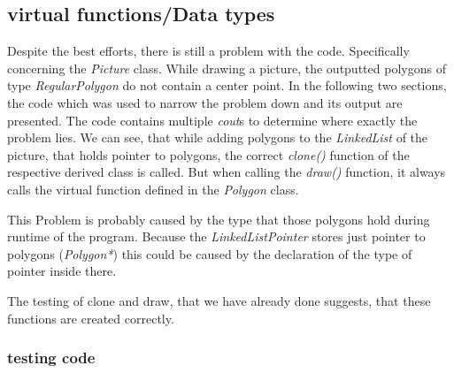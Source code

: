 \documentclass[11pt,titlepage]{article}
\begin{document}
		\subsection{virtual functions/Data types}
			Despite the best efforts, there is still a problem with the code. Specifically concerning the \emph{Picture} class. While drawing a picture, the outputted polygons of type \emph{RegularPolygon} do not contain a center point. In the following two sections, the code which was used to narrow the problem down and its output are presented.
			The code contains multiple \emph{cout}s to determine where exactly the problem lies.
			We can see, that while adding polygons to the \emph{LinkedList} of the picture, that holds pointer to polygons, the correct \emph{clone()} function of the respective derived class is called. But when calling the \emph{draw()} function, it always calls the virtual function defined in the \emph{Polygon} class.
			
			This Problem is probably caused by the type that those polygons hold during runtime of the program. Because the \emph{LinkedListPointer} stores just pointer to polygons (\emph{Polygon*}) this could be caused by the declaration of the type of pointer inside there.
			
			The testing of clone and draw, that we have already done suggests, that these functions are created correctly.
			\subsubsection{testing code}	
		
				
		
\end{document}
